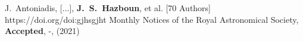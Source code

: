          {J.~{Antoniadis}, [...], \textbf{J.~S.~{Hazboun}}, et al. [70 Authors]}
         {https://doi.org/doi:gjhsgjht}
         {{Monthly Notices of the Royal Astronomical Society}, \textbf{Accepted}, -, (2021)}


